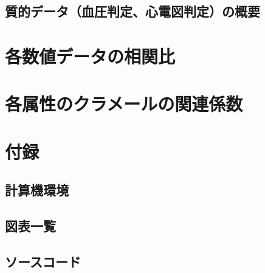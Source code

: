 \documentclass[dvipdfmx]{jsarticle}
\begin{document}
    \subsection{質的データ（血圧判定、心電図判定）の概要}
\section{各数値データの相関比}
\section{各属性のクラメールの関連係数}
\section*{付録}
    \subsection*{計算機環境}
    \subsection*{図表一覧}
    \subsection*{ソースコード}
\end{document}
